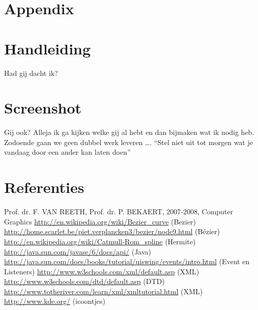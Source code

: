 \documentclass[a4paper,11pt,oneside, titlepage]{article}
\begin{document}
\section{Appendix}
\appendix
\section{Handleiding}
Had gij dacht ik?
\section{Screenshot}
Gij ook? Alleja ik ga kijken welke gij al hebt en dan bijmaken wat ik nodig heb. Zodoende gaan
we geen dubbel werk leveren \ldots. ``Stel niet uit tot morgen wat je vandaag door een ander
kan laten doen''
\section{Referenties}
Prof. dr. F. VAN REETH, Prof. dr. P. BEKAERT, 2007-2008, Computer Graphics\newline
\url{http://en.wikipedia.org/wiki/Bezier\_curve} (Bezier)\newline
\url{http://home.scarlet.be/piet.verplancken3/bezier/node9.html} (B\'ezier)\newline
\url{http://en.wikipedia.org/wiki/Catmull-Rom\_spline} (Hermite)\newline
\url{http://java.sun.com/javase/6/docs/api/} (Java)\newline
\url{http://java.sun.com/docs/books/tutorial/uiswing/events/intro.html} (Event en Listeners)\newline
\url{http://www.w3schools.com/xml/default.asp} (XML)\newline
\url{http://www.w3schools.com/dtd/default.asp} (DTD)\newline
\url{http://www.totheriver.com/learn/xml/xmltutorial.html} (XML)\newline
\url{http://www.kde.org/} (icoontjes)\newline
\end{document}

